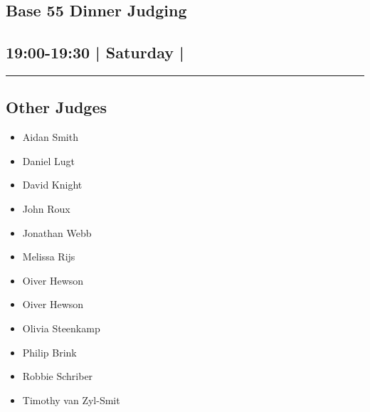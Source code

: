 \documentclass[10pt, A5]{article}
\begin{document}
	

		\begin{framed}
			\begin{minipage}{\textwidth}

			\setcounter{section}{70}
							\section{\faStar \: Base 55 \faStar \: Dinner Judging}
						
			\subsection*{19:00-19:30 | Saturday | }

			\vspace{0.25cm}
			\hrule
			\vspace{0.25cm}


			\subsection*{Other Judges}
							

				\begin{multicols}{2}

			\begin{itemize}
											\item Aidan Smith
											\item Daniel Lugt
											\item David Knight
											\item John Roux
											\item Jonathan Webb
											\item Melissa Rijs
											\item Oiver Hewson
								\end{itemize}

			\vfill\null
			\columnbreak

			\begin{itemize}
											\item Oiver Hewson
											\item Olivia Steenkamp
											\item Philip Brink
											\item Robbie Schriber
											\item Timothy van Zyl-Smit
								\end{itemize}

			\vfill\null

			\end{multicols}


\end{minipage}
\end{framed}
\end{document}
